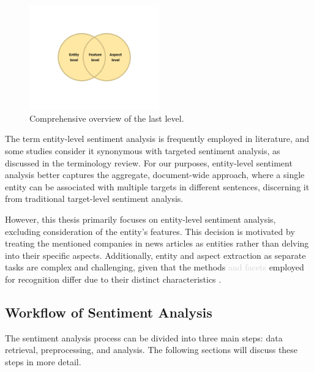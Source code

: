 \begin{figure}[H]
    \centering
    \includegraphics[width=0.5\textwidth]{img/entity-feature-aspect-level.pdf}
    \caption{Comprehensive overview of the last level.}
    \label{fig:enity-feature-aspect-level}
\end{figure}


The term entity-level sentiment analysis is frequently employed in literature, and some studies consider it synonymous with targeted sentiment analysis, \linebreak as discussed \cite{ronningstad-etal-2022-entity} in the terminology review. For our purposes, entity-level sentiment analysis better captures the aggregate, document-wide approach, where a single entity can be associated with multiple targets in different sentences, discerning it from traditional target-level sentiment analysis. 

However, this thesis primarily focuses on entity-level sentiment analysis, excluding consideration of the entity's features. This decision is motivated by treating the mentioned companies in news articles as entities rather than delving into their specific aspects. Additionally, entity and aspect extraction as separate tasks are complex and challenging, given that the methods \textcolor{lightgray}{and facets} employed for recognition differ due to their distinct characteristics \parencite{Liu2015, Zhang2014}. 

\subsection{Workflow of Sentiment Analysis}
\label{subsec:workflow-of-sentiment-analysis}
The sentiment analysis process can be divided into three main steps: data retrieval, preprocessing, and analysis. The following sections will discuss these steps in more detail.

